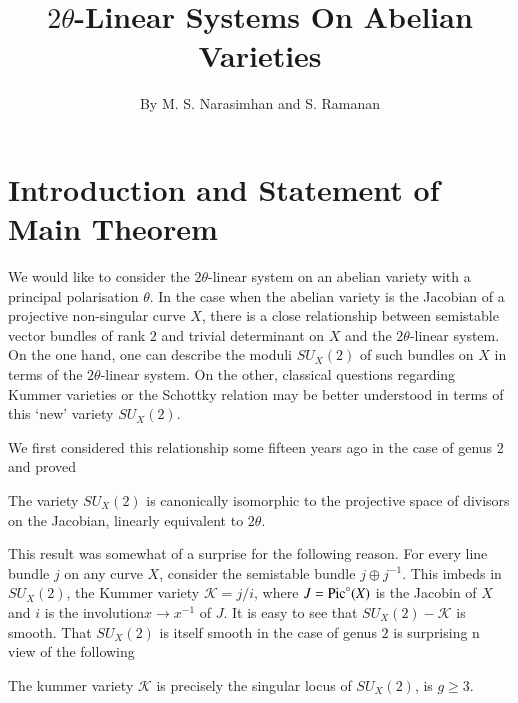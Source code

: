\title{$2\theta$-Linear Systems On Abelian Varieties}

\author{By M. S. Narasimhan and S. Ramanan}

\date{}
\maketitle


\setcounter{page}{315}

\setcounter{pageoriginal}{414}
\section{Introduction and Statement of Main Theorem}\label{s1}\pageoriginale

We would like to consider the $2\theta$-linear system on an abelian
variety with a principal polarisation $\theta$. In the case when the
abelian variety is the Jacobian of a projective non-singular curve
$X$, there is a close relationship between semistable vector bundles
of rank $2$ and trivial determinant on $X$ and the $2\theta$-linear
system. On the one hand, one can describe the moduli $SU_X(2)$ of such
bundles on $X$ in terms of the $2\theta$-linear system. On the other,
classical questions regarding Kummer varieties or the Schottky
relation may be better understood in terms of this `new' variety
$SU_X(2)$. 

We first considered this relationship some fifteen years ago in the
case of genus $2$ and proved 

\begin{THM}\label{THM1}
The variety $SU_X(2)$ is canonically isomorphic to the projective
space of divisors on the Jacobian, linearly equivalent to $2\theta$. 
\end{THM}

This result was somewhat of a surprise for the following reason. For
every line bundle $j$ on any curve $X$, consider the semistable bundle
$j\oplus j^{-1}$. This imbeds in $SU_X(2)$, the Kummer variety
$\mathscr{K}=j/i$, where $J=\mathrm{Pic}^{\circ}(X)$ is the Jacobin of $X$ and
$i$ is the involution\pageoriginale $x\to x^{-1}$ of $J$. It is easy to see that
$SU_X(2)-\mathscr{K}$ is smooth. That $SU_X(2)$ is itself smooth in
the case of genus $2$ is surprising n view of the following  

\begin{THM}\label{THM2}
The kummer variety $\mathscr{K}$ is precisely the singular locus of
$SU_X(2)$, is $g\geq 3$.
\end{THM}

